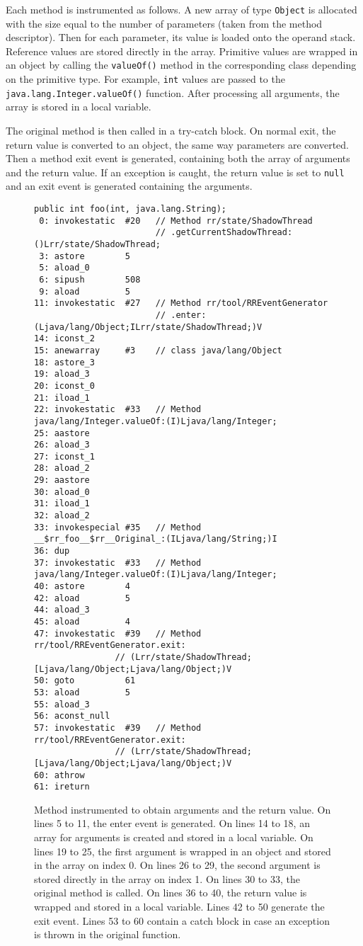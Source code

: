 Each method is instrumented as follows. A new array of type \texttt{Object} is
allocated with the size equal to the number of parameters (taken from the method
descriptor). Then for each parameter, its value is loaded onto the operand
stack. Reference values are stored directly in the array. Primitive values are
wrapped in an object by calling the \texttt{valueOf()} method in the
corresponding class depending on the primitive type. For example, \texttt{int}
values are passed to the \texttt{java.lang.Integer.valueOf()} function. After
processing all arguments, the array is stored in a local variable.

The original method is then called in a try-catch block. On normal exit, the
return value is converted to an object, the same way parameters are converted.
Then a method exit event is generated, containing both the array of arguments
and the return value. If an exception is caught, the return value is set to
\texttt{null} and an exit event is generated containing the arguments.

\begin{figure}[hbt]
    \label{paramInst}
    \begin{lstlisting}
public int foo(int, java.lang.String);
 0: invokestatic  #20   // Method rr/state/ShadowThread
                        // .getCurrentShadowThread:()Lrr/state/ShadowThread;
 3: astore        5
 5: aload_0
 6: sipush        508
 9: aload         5
11: invokestatic  #27   // Method rr/tool/RREventGenerator
                        // .enter:(Ljava/lang/Object;ILrr/state/ShadowThread;)V
14: iconst_2
15: anewarray     #3    // class java/lang/Object
18: astore_3
19: aload_3
20: iconst_0
21: iload_1
22: invokestatic  #33   // Method java/lang/Integer.valueOf:(I)Ljava/lang/Integer;
25: aastore
26: aload_3
27: iconst_1
28: aload_2
29: aastore
30: aload_0
31: iload_1
32: aload_2
33: invokespecial #35   // Method __$rr_foo__$rr__Original_:(ILjava/lang/String;)I
36: dup
37: invokestatic  #33   // Method java/lang/Integer.valueOf:(I)Ljava/lang/Integer;
40: astore        4
42: aload         5
44: aload_3
45: aload         4
47: invokestatic  #39   // Method rr/tool/RREventGenerator.exit:
                // (Lrr/state/ShadowThread;[Ljava/lang/Object;Ljava/lang/Object;)V
50: goto          61
53: aload         5
55: aload_3
56: aconst_null
57: invokestatic  #39   // Method rr/tool/RREventGenerator.exit:
                // (Lrr/state/ShadowThread;[Ljava/lang/Object;Ljava/lang/Object;)V
60: athrow
61: ireturn\end{lstlisting}
    \caption{Method instrumented to obtain arguments and the return value. On
    lines 5 to 11, the enter event is generated. On lines 14 to 18, an array for
    arguments is created and stored in a local variable. On lines 19 to 25, the
    first argument is wrapped in an object and stored in the array on index 0.
    On lines 26 to 29, the second argument is stored directly in the array on
    index 1. On lines 30 to 33, the original method is called. On lines 36 to
    40, the return value is wrapped and stored in a local variable. Lines 42 to
    50 generate the exit event. Lines 53 to 60 contain a catch block in case an
    exception is thrown in the original function.}
\end{figure}

